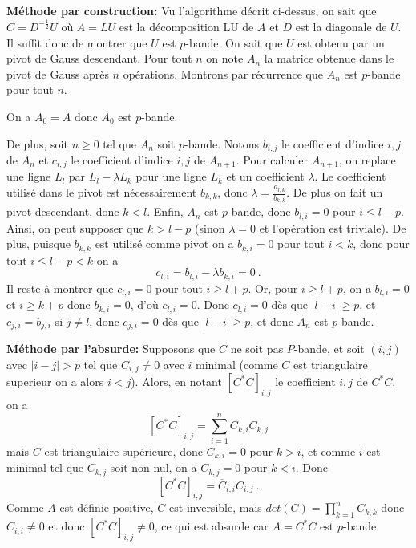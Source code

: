 \documentclass[10pt,a4paper]{article}
\newcommand{\abs}[1]{{\left|{#1}\right|}}
\begin{document}
\begin{enumerate}
{\bf Méthode par construction:} Vu l'algorithme décrit ci-dessus, on sait que $C=D^{-\frac{1}{2}} U$ où $A=LU$ est la décomposition LU de $A$ et $D$ est la diagonale de $U$. Il suffit donc de montrer que $U$ est $p$-bande. On sait que $U$ est obtenu par un pivot de Gauss descendant. Pour tout $n$ on note $A_n$ la matrice obtenue dans le pivot de Gauss après $n$ opérations. Montrons par récurrence que $A_n$ est $p$-bande pour tout $n$.

On a $A_0=A$ donc $A_0$ est $p$-bande.

De plus, soit $n\geq 0$ tel que $A_n$ soit $p$-bande. Notons $b_{i,j}$ le coefficient d'indice $i,j$ de $A_n$ et $c_{i,j}$ le coefficient d'indice $i,j$ de $A_{n+1}$. Pour calculer $A_{n+1}$, on replace une ligne $L_l$ par $L_l-\lambda L_k$ pour une ligne $L_k$ et un coefficient $\lambda$. Le coefficient utilisé dans le pivot est nécessairement $b_{k,k}$, donc $\lambda=\frac{a_{l,k}}{b_{k,k}}$. De plus on fait un pivot descendant, donc $k<l$. Enfin, $A_n$ est $p$-bande, donc $b_{l,i}=0$ pour $i\leq l-p$. Ainsi, on peut supposer que $k>l-p$ (sinon $\lambda=0$ et l'opération est triviale). De plus, puisque $b_{k,k}$ est utilisé comme pivot on a $b_{k,i}=0$ pour tout $i<k$, donc pour tout $i\leq l-p<k$ on a  
\[
c_{l,i}=b_{l,i}-\lambda b_{k,i}=0~.
\]
Il reste à montrer que $c_{l,i}=0$ pour tout $i\geq l+p$. Or, pour $i\geq l+p$, on a $b_{l,i}=0$ et $i\geq k+p$ donc $b_{k,i}=0$, d'où $c_{l,i}=0$. Donc $c_{l,i}=0$ dès que $\abs{l-i}\geq p$, et $c_{j,i}=b_{j,i}$ si $j\neq l$, donc $c_{j,i}=0$ dès que $\abs{l-i}\geq p$, et donc $A_n$ est $p$-bande. 


{\bf Méthode par l'absurde:} Supposons que $C$ ne soit pas $P$-bande, et soit $(i, j)$ avec $\abs{i-j}>p$ tel que $C_{i,j}\neq 0$ avec $i$ minimal (comme $C$ est triangulaire superieur on a alors $i<j$). Alors, en notant $[C^*C]_{i,j}$ le coefficient $i,j$ de $C^*C$, on a
\[
[C^*C]_{i,j}=\sum_{i=1}^n \overline{C}_{k, i} C_{k, j}
\]
mais $C$ est triangulaire supérieure, donc $C_{k,i}=0$ pour $k>i$, et comme $i$ est minimal tel que $C_{k,j}$ soit non nul, on a $C_{k,j}=0$ pour $k<i$. Donc 
\[
[C^*C]_{i,j}=\overline{C}_{i,i} C_{i,j}~.
\]
Comme $A$ est définie positive, $C$ est inversible, mais $det(C)=\prod_{k=1}^n C_{k,k}$ donc $C_{i,i}\neq 0$ et donc $[C^*C]_{i,j}\neq 0$, ce qui est absurde car $A=C^*C$ est $p$-bande.
\end{enumerate}

\eexer
\end{document}
